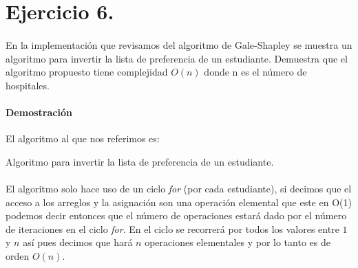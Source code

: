 \documentclass[12pt]{article}
\begin{document}
\section{Ejercicio 6.}
\paragraph{}En la implementación que revisamos del algoritmo de Gale-Shapley se muestra un algoritmo para invertir la lista de preferencia de un estudiante. Demuestra que el algoritmo propuesto tiene complejidad $O(n)$ donde n es el número de hospitales.
\paragraph{Demostración} El algoritmo al que nos referimos es:\\

\begin{algorithm}[H]\footnotesize
	\SetAlgoLined
	\caption{Algoritmo para invertir la lista de preferencia de un estudiante.}
\end{algorithm}
\paragraph{} El algoritmo solo hace uso de un ciclo \textit{for} (por cada estudiante), si decimos que el acceso a los arreglos y la asignación son una operación elemental que este en O(1) podemos decir entonces que el número de operaciones estará dado por el número de iteraciones en el ciclo \textit{for}. En el ciclo se recorrerá por todos los valores entre $1$ y $n$ así pues decimos que hará $n$ operaciones elementales y por lo tanto es de orden $O(n)$.
\end{document}
